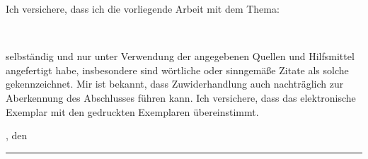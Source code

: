 Ich versichere, dass ich die vorliegende Arbeit mit dem Thema:

\begin{center}
\textit{\glqq\titel\grqq}\\[1em]
\end{center}
			
selbständig und nur unter Verwendung der angegebenen Quellen und Hilfsmittel angefertigt habe, insbesondere sind wörtliche oder sinngemäße Zitate als solche gekennzeichnet. Mir ist bekannt, dass Zuwiderhandlung auch nachträglich zur Aberkennung des Abschlusses führen kann. Ich versichere, dass das elektronische Exemplar mit den gedruckten Exemplaren übereinstimmt.
\par
\ort, den \eingereicht


\rule[-0.2cm]{5cm}{0.5pt}

\textsc{\autor} 
